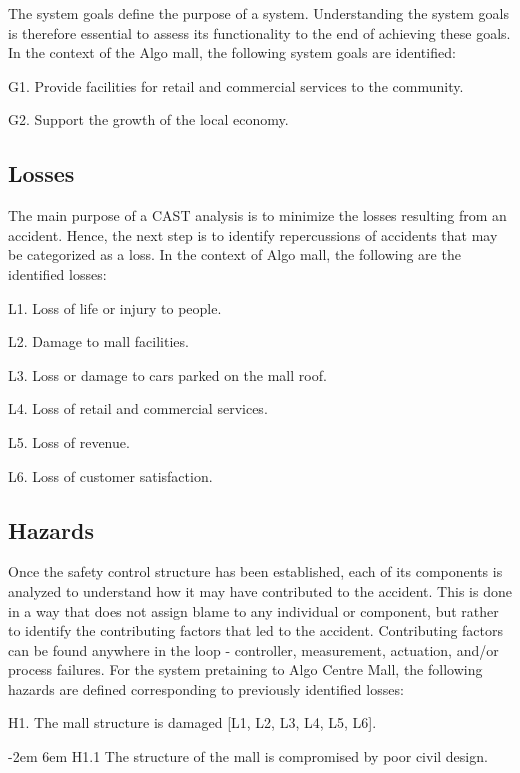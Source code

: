 \documentclass[12pt]{article}
\begin{document}
The system goals define the purpose of a system. Understanding the system goals is therefore essential to assess its functionality to the end of achieving these goals. In the context of the Algo mall, the following system goals are identified:

G1. Provide facilities for retail and commercial services to the community.

G2. Support the growth of the local economy.

\subsection{Losses}

The main purpose of a CAST analysis is to minimize the losses resulting from an accident. Hence, the next step is to identify repercussions of accidents that may be categorized as a loss. In the context of Algo mall, the following are the identified losses:

L1. Loss of life or injury to people.

L2. Damage to mall facilities.

L3. Loss or damage to cars parked on the mall roof.

L4. Loss of retail and commercial services.

L5. Loss of revenue.

L6. Loss of customer satisfaction.

\subsection{Hazards}

Once the safety control structure has been established, each of its components is analyzed to understand how it may have contributed to the accident. This is done in a way that does not assign blame to any individual or component, but rather to identify the contributing factors that led to the accident. Contributing factors can be found anywhere in the loop - controller, measurement, actuation, and/or process failures. For the system pretaining to Algo Centre Mall, the following hazards are defined corresponding to previously identified losses:

H1. The mall structure is damaged [L1, L2, L3, L4, L5, L6].

{\parindent -2em
\leftskip 6em 
H1.1 The structure of the mall is compromised by poor civil design.

} 
\end{document}
